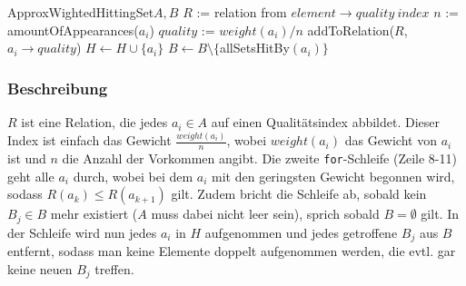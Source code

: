 \documentclass[a4paper]{article}
\begin{document}
	\maketitle
	\section{}
		\begin{pseudocode}{ApproxWightedHittingSet}{$A, B$}
			\State $R$ := relation from $element \rightarrow quality ~index$
				\State $n$ := amountOfAppearances($a_i$)
				\State $quality$ := $weight(a_i) / n$
				\State addToRelation($R$, $a_i\rightarrow quality$)
			\EndFor
				\State $H\gets H\cup \{a_i\}$
				\State $B\gets B\setminus\{$allSetsHitBy$(a_i)\}$
			\EndFor
		\end{pseudocode}
		\subsubsection*{Beschreibung}
		$R$ ist eine Relation, die jedes $a_i\in A$ auf einen Qualitätsindex abbildet.
		Dieser Index ist einfach das Gewicht $\frac{weight(a_i)}{n}$, wobei $weight(a_i)$ das Gewicht von $a_i$ ist und $n$ die Anzahl der Vorkommen angibt.\n
		Die zweite \texttt{for}-Schleife (Zeile 8-11) geht alle $a_i$ durch, wobei bei dem $a_i$ mit den geringsten Gewicht begonnen wird, sodass $R(a_k)\leq R(a_{k+1})$ gilt.
		Zudem bricht die Schleife ab, sobald kein $B_j\in B$ mehr existiert ($A$ muss dabei nicht leer sein), sprich sobald $B=\emptyset$ gilt.\n
		In der Schleife wird nun jedes $a_i$ in $H$ aufgenommen und jedes getroffene $B_j$ aus $B$ entfernt, sodass man keine Elemente doppelt aufgenommen werden, die evtl. gar keine neuen $B_j$ treffen.
\end{document}

